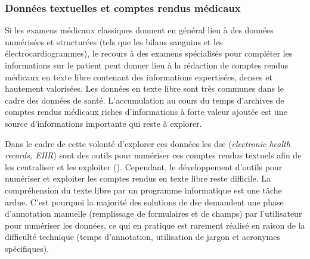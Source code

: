 \subsubsection{Données textuelles et comptes rendus médicaux}
Si les examens médicaux classiques donnent en général lieu à des données numérisées et structurées (tels que les bilans sanguins et les électrocardiogrammes), le recours à des examens spécialisés pour compléter les informations sur le patient peut donner lieu à la rédaction de comptes rendus médicaux en texte libre contenant des informations expertisées, denses et hautement valorisées. Les données en texte libre sont très communes dans le cadre des données de santé. L'accumulation au cours du temps d'archives de comptes rendus médicaux riches d'informations à forte valeur ajoutée est une source d'informations importante qui reste à explorer.

Dans le cadre de cette volonté d'explorer ces données les \gls{dse} (\textit{electronic health records, EHR}) sont des outils pour numériser ces comptes rendus textuels afin de les centraliser et les exploiter (\cite{graber_impact_2017}). Cependant, le développement d'outils pour numériser et exploiter les comptes rendus en texte libre reste difficile. La compréhension du texte libre par un programme informatique est une tâche ardue. C'est pourquoi la majorité des solutions de \gls{dse} demandent une phase d'annotation manuelle (remplissage de formulaires et de champs) par l'utilisateur pour numériser les données, ce qui en pratique est rarement réalisé en raison de la difficulté technique (temps d'annotation, utilisation de jargon et acronymes spécifiques).


